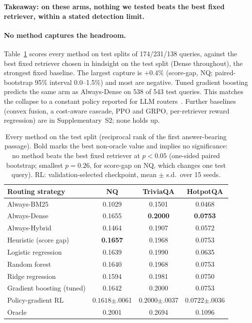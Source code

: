 \documentclass{article}
\begin{document}
\textbf{Takeaway: on these arms, nothing we tested beats the best fixed retriever, within a stated
detection limit.}

\paragraph{No method captures the headroom.} Table~\ref{tab:capture} scores every method on test
splits of 174/231/138 queries, against the best fixed retriever chosen in hindsight on the test
split (Dense throughout), the strongest fixed baseline. The largest capture is $+0.4\%$ (score-gap,
NQ; paired-bootstrap 95\% interval 0.0--1.5\%) and most are negative. Tuned gradient boosting
predicts the same arm as Always-Dense on 538 of 543 test queries. This matches the collapse to a
constant policy reported for LLM routers~\cite{garg2026unsolvability}. Further baselines (convex
fusion, a cost-aware cascade, PPO and GRPO, per-retriever reward regression) are in
Supplementary~S2; none holds up.

\begin{table}[t]
\centering
\small
\caption{Every method on the test split (reciprocal rank of the first answer-bearing passage).
Bold marks the best non-oracle value and implies no significance: no method beats the best fixed
retriever at $p<0.05$ (one-sided paired bootstrap; smallest $p{=}0.26$, for score-gap on NQ,
which changes one test query). RL: validation-selected
checkpoint, mean $\pm$ s.d.\ over 15 seeds.\protect\footnotemark{}}
\label{tab:capture}
\begin{tabular}{lccc}
\toprule
Routing strategy & NQ & TriviaQA & HotpotQA \\
\midrule
Always-BM25   & 0.1029 & 0.1501 & 0.0468 \\
Always-Dense  & 0.1655 & \textbf{0.2000} & \textbf{0.0753} \\
Always-Hybrid & 0.1464 & 0.1907 & 0.0572 \\
\midrule
Heuristic (score gap)      & \textbf{0.1657} & 0.1968 & 0.0753 \\
Logistic regression        & 0.1639 & 0.1990 & 0.0635 \\
Random forest              & 0.1640 & 0.1968 & 0.0753 \\
Ridge regression           & 0.1594 & 0.1981 & 0.0750 \\
Gradient boosting (tuned)  & 0.1642 & 0.2000 & 0.0753 \\
Policy-gradient RL         & $0.1618${\scriptsize$\pm$.0061} & $0.2000${\scriptsize$\pm$.0037}
                           & $0.0722${\scriptsize$\pm$.0036} \\
\midrule
Oracle & 0.2001 & 0.2694 & 0.1096 \\
\bottomrule
\end{tabular}
\end{table}
\end{document}
